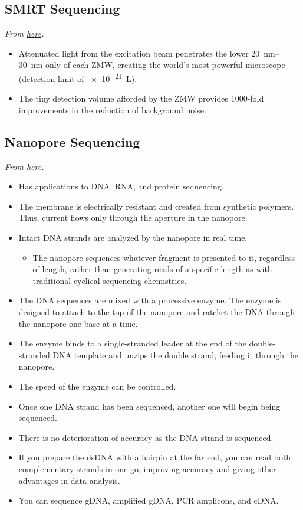\documentclass[../notes.tex]{subfiles}
\begin{document}
\subsection*{SMRT Sequencing}
\emph{From \href{https://youtu.be/NHCJ8PtYCFc}{here}.}
\begin{itemize}
    \item Attenuated light from the excitation beam penetrates the lower \SIrange{20}{30}{\nano\meter} only of each ZMW, creating the world's most powerful microscope (detection limit of \SI{e-21}{\liter}).
    \item The tiny detection volume afforded by the ZMW provides 1000-fold improvements in the reduction of background noise.
\end{itemize}


\subsection*{Nanopore Sequencing}
\emph{From \href{https://youtu.be/E9-Rm5AoZGw}{here}.}
\begin{itemize}
    \item Has applications to DNA, RNA, and protein sequencing.
    \item The membrane is electrically resistant and created from synthetic polymers. Thus, current flows only through the aperture in the nanopore.
    \item Intact DNA strands are analyzed by the nanopore in real time.
    \begin{itemize}
        \item The nanopore sequences whatever fragment is presented to it, regardless of length, rather than generating reads of a specific length as with traditional cyclical sequencing chemistries.
    \end{itemize}
    \item The DNA sequences are mixed with a processive enzyme. The enzyme is designed to attach to the top of the nanopore and ratchet the DNA through the nanopore one base at a time.
    \item The enzyme binds to a single-stranded leader at the end of the double-stranded DNA template and unzips the double strand, feeding it through the nanopore.
    \item The speed of the enzyme can be controlled.
    \item Once one DNA strand has been sequenced, another one will begin being sequenced.
    \item There is no deterioration of accuracy as the DNA strand is sequenced.
    \item If you prepare the dsDNA with a hairpin at the far end, you can read both complementary strands in one go, improving accuracy and giving other advantages in data analysis.
    \item You can sequence gDNA, amplified gDNA, PCR amplicons, and cDNA.
\end{itemize}
\end{document}
